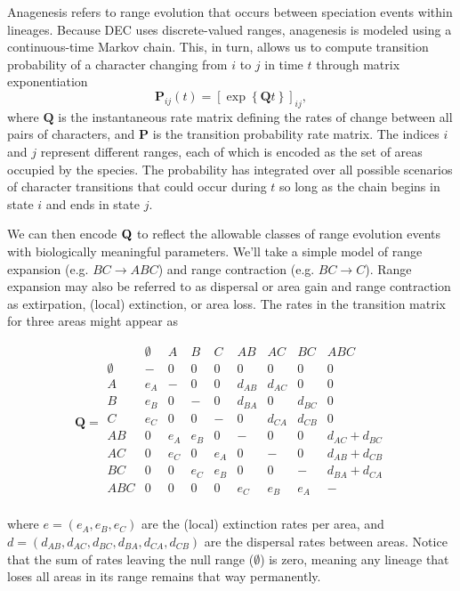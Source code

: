 Anagenesis refers to range evolution that occurs between speciation events within lineages.
Because DEC uses discrete-valued ranges, anagenesis is modeled using a continuous-time Markov chain.
This, in turn, allows us to compute transition probability of a character changing from $i$ to $j$ in time $t$ through matrix exponentiation
\[
\mathbf{P}_{ij}(t) = \left[ \exp \left\lbrace \mathbf{Q}t \right\rbrace \right]_{ij},
\]
where $\textbf{Q}$ is the instantaneous rate matrix defining the rates of change between all pairs of characters, and $\textbf{P}$ is the transition probability rate matrix.
The indices $i$ and $j$ represent different ranges, each of which is encoded as the set of areas occupied by the species.
The probability has integrated over all possible scenarios of character transitions that could occur during $t$ so long as the chain begins in state $i$ and ends in state $j$.

We can then encode ${\bf Q}$ to reflect the allowable classes of range evolution events with biologically meaningful parameters.
We'll take a simple model of range expansion (e.g. $BC \rightarrow ABC$) and range contraction (e.g. $BC \rightarrow C$).
Range expansion may also be referred to as dispersal or area gain and range contraction as extirpation, (local) extinction, or area loss.
The rates in the transition matrix for three areas might appear as

\[
\textbf{Q} = 
	\begin{array}{c|cccccccc}
		& \emptyset & A & B & C & AB & AC & BC & ABC \\
		\hline
		\emptyset 	& - 	& 0 	& 0 	& 0 		& 0			& 0 		& 0 		& 0 \\
		A 			& e_A 	& - 	& 0 	& 0 		& d_{AB}	& d_{AC} 	& 0 		& 0 \\
		B 			& e_B 	& 0 	& - 	& 0 		& d_{BA}	& 0 		& d_{BC} 	& 0 \\
		C 			& e_C 	& 0 	& 0 	& - 		& 0 		& d_{CA} 	& d_{CB} 	& 0 \\
		AB 			& 0 	& e_A 	& e_B 	& 0 		& -			& 0 		& 0 		& d_{AC} + d_{BC} \\
		AC 			& 0 	& e_C 	& 0 	& e_A 		& 0			& - 		& 0 		& d_{AB} + d_{CB} \\
		BC 			& 0 	& 0 	& e_C 	& e_B 		& 0			& 0 		& - 		& d_{BA} + d_{CA} \\
		ABC 		& 0 	& 0 	& 0 	& 0 		& e_C 		& e_B 		& e_A 		& - \\								
	\end{array}
\]

where $e = ( e_A, e_B, e_C )$ are the (local) extinction rates per area, and $d = ( d_{AB}, d_{AC}, d_{BC}, d_{BA}, d_{CA}, d_{CB})$ are the dispersal rates between areas.
Notice that the sum of rates leaving the null range ($\emptyset$) is zero, meaning any lineage that loses all areas in its range remains that way permanently.

